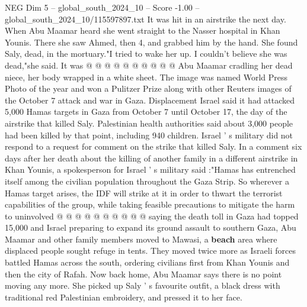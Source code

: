 \begin{textsample}{NEG Dim 5 – global\_south\_2024\_10 – Score -1.00 – global\_south\_2024\_10/115597897.txt}
It was hit in an airstrike the next day.
When Abu Maamar heard she went straight to the Nasser hospital in Khan Younis.
There she saw Ahmed, then 4, and grabbed him by the hand.
She found Saly, dead, in the mortuary."I tried to wake her up.
I couldn't believe she was dead,"she said.
It was @ @ @ @ @ @ @ @ @ @ Abu Maamar cradling her dead niece, her body wrapped in a white sheet.
The image was named World Press Photo of the year and won a Pulitzer Prize along with other Reuters images of the October 7 attack and war in Gaza.
Displacement Israel said it had attacked 5,000 Hamas targets in Gaza from October 7 until October 17, the day of the airstrike that killed Saly.
Palestinian health authorities said about 3,000 people had been killed by that point, including 940 children.
Israel ' s military did not respond to a request for comment on the strike that killed Saly.
In a comment six days after her death about the killing of another family in a different airstrike in Khan Younis, a spokesperson for Israel ' s military said :"Hamas has entrenched itself among the civilian population throughout the Gaza Strip.
So wherever a Hamas target arises, the IDF will strike at it in order to thwart the terrorist capabilities of the group, while taking feasible precautions to mitigate the harm to uninvolved @ @ @ @ @ @ @ @ @ @ saying the death toll in Gaza had topped 15,000 and Israel preparing to expand its ground assault to southern Gaza, Abu Maamar and other family members moved to Mawasi, a \textbf{beach} area where displaced people sought refuge in tents.
They moved twice more as Israeli forces battled Hamas across the south, ordering civilians first from Khan Younis and then the city of Rafah.
Now back home, Abu Maamar says there is no point moving any more.
She picked up Saly ' s favourite outfit, a black dress with traditional red Palestinian embroidery, and pressed it to her face.

\end{textsample}
